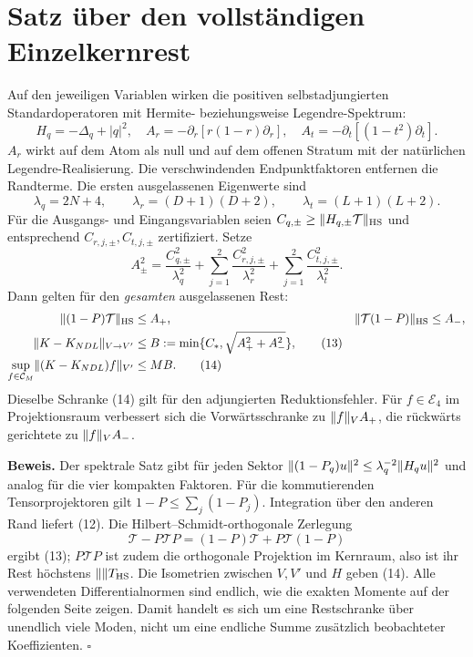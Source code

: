 \documentclass[10pt,a4paper]{article}
\newcommand{\TT}{\mathcal T}\newcommand{\EE}{\mathbb E}\newcommand{\HS}{\mathrm{HS}}
\begin{document}
\section{Satz über den vollständigen Einzelkernrest}
Auf den jeweiligen Variablen wirken die positiven selbstadjungierten
Standardoperatoren mit Hermite- beziehungsweise Legendre-Spektrum:
\[
 H_q=-\Delta_q+|q|^2,\quad
 A_r=-\partial_r[r(1-r)\partial_r],\quad
 A_t=-\partial_t[(1-t^2)\partial_t].                       \tag{10}
\]
$A_r$ wirkt auf dem Atom als null und auf dem offenen Stratum mit der
natürlichen Legendre-Realisierung. Die verschwindenden Endpunktfaktoren
entfernen die Randterme. Die ersten ausgelassenen Eigenwerte sind
\[
 \lambda_q=2N+4,\qquad\lambda_r=(D+1)(D+2),\qquad
 \lambda_t=(L+1)(L+2).                                   \tag{11}
\]
Für die Ausgangs- und Eingangsvariablen seien
$C_{q,\pm}\ge\norm{H_{q,\pm}\TT}_{\HS}$ und entsprechend
$C_{r,j,\pm},C_{t,j,\pm}$ zertifiziert. Setze
\[
 A_\pm^2=\frac{C_{q,\pm}^2}{\lambda_q^2}
       +\sum_{j=1}^2\frac{C_{r,j,\pm}^2}{\lambda_r^2}
       +\sum_{j=1}^2\frac{C_{t,j,\pm}^2}{\lambda_t^2}.
                                                                  \tag{12}
\]
Dann gelten für den \emph{gesamten} ausgelassenen Rest:
\begin{align}
 \norm{(1-P)\TT}_{\HS}&\le A_+, &
 \norm{\TT(1-P)}_{\HS}&\le A_-,\notag\\
 \norm{K-K_{N D L}}_{V\to V'}&\le
 B:=\min\{C_*,\sqrt{A_+^2+A_-^2}\},                       \tag{13}\\
 \sup_{f\in\mathcal C_M}\norm{(K-K_{N D L})f}_{V'}&\le MB.
                                                                  \tag{14}
\end{align}
Dieselbe Schranke (14) gilt für den adjungierten Reduktionsfehler.
Für $f\in\mathcal E_4$ im Projektionsraum verbessert sich die Vorwärtsschranke
zu $\lVert f\rVert_V A_+$, die rückwärts gerichtete zu $\lVert f\rVert_V A_-$.

\textbf{Beweis.} Der spektrale Satz gibt für jeden Sektor
$\lVert(1-P_q)u\rVert^2\le\lambda_q^{-2}\lVert H_qu\rVert^2$ und analog für die
vier kompakten Faktoren. Für die kommutierenden Tensorprojektoren gilt
$1-P\le\sum_j(1-P_j)$. Integration über den anderen Rand liefert (12).
Die Hilbert--Schmidt-orthogonale Zerlegung
\[
 \TT-P\TT P=(1-P)\TT+P\TT(1-P)
\]
ergibt (13); $P\TT P$ ist zudem die orthogonale Projektion im Kernraum,
also ist ihr Rest höchstens $\norm\TT_{\HS}$. Die Isometrien zwischen
$V,V'$ und $H$ geben (14). Alle verwendeten Differentialnormen sind endlich,
wie die exakten Momente auf der folgenden Seite zeigen. Damit handelt es
sich um eine Restschranke über unendlich viele Moden, nicht um eine endliche
Summe zusätzlich beobachteter Koeffizienten. \hfill$\square$
\end{document}
